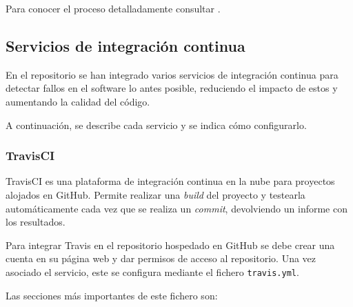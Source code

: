 Para conocer el proceso detalladamente consultar
\citep{android:compilerun}.

\subsection{Servicios de integración
continua}\label{servicios-de-integracion-continua}

En el repositorio se han integrado varios servicios de integración
continua para detectar fallos en el software lo antes posible,
reduciendo el impacto de estos y aumentando la calidad del código.

A continuación, se describe cada servicio y se indica cómo configurarlo.

\subsubsection{TravisCI}\label{travisci}

TravisCI es una plataforma de integración continua en la nube para
proyectos alojados en GitHub. Permite realizar una \emph{build} del
proyecto y testearla automáticamente cada vez que se realiza un
\emph{commit}, devolviendo un informe con los resultados.

Para integrar Travis en el repositorio hospedado en GitHub se debe crear
una cuenta en su página web y dar permisos de acceso al repositorio. Una
vez asociado el servicio, este se configura mediante el fichero
\texttt{travis.yml}.

Las secciones más importantes de este fichero son:

